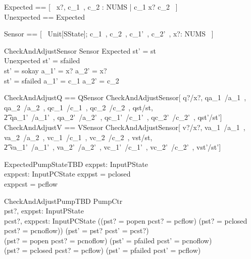 \documentclass{report} %
\begin{document}
\begin{zed}
  Expected == [~ x?, c\_1~, c\_2 : NUMS | c\_1 \leq x? \leq c\_2 ~] \\ %
  Unexpected == \lnot Expected 
\end{zed}

\begin{zed}
  Sensor == [~ \Delta Unit[SState]; c\_1~, c\_2~, c\_1'~, c\_2'~, x?: NUMS ~]
\end{zed}

\begin{schema}{CheckAndAdjustSensor}
  Sensor
  \where %
  Expected \implies st' = st \\ %
  Unexpected \implies st' = sfailed \\ %
  st' = sokay \implies a\_1' = x? \land a\_2' = x?  \\ %
  st' = sfailed \implies a\_1' = c\_1 \land a\_2' = c\_2
\end{schema}

\begin{zed}
  CheckAndAdjustQ == QSensor \land {} %
    CheckAndAdjustSensor[
      q?/x?, qa\_1~/a\_1~, qa\_2~/a\_2~, qc\_1~/c\_1~, qc\_2~/c\_2~, qst/st, %
      \\ \t2 %
      qa\_1'~/a\_1'~, qa\_2'~/a\_2'~, qc\_1'~/c\_1'~, qc\_2'~/c\_2'~, qst'/st']
  \also %
  CheckAndAdjustV == VSensor \land {} %
    CheckAndAdjustSensor[
      v?/x?, va\_1~/a\_1~, va\_2~/a\_2~, vc\_1~/c\_1~, vc\_2~/c\_2~, vst/st,
      \\ \t2 %
      va\_1'~/a\_1'~, va\_2'~/a\_2'~, vc\_1'~/c\_1'~, vc\_2'~/c\_2'~, vst'/st']
\end{zed}

\begin{schema}{ExpectedPumpStateTBD}
  exppst: InputPState \\ %
  exppcst: InputPCState
  \where
  exppst = pclosed \\
  exppcst = pcflow
\end{schema}

\begin{schema}{CheckAndAdjustPumpTBD}
  \Delta PumpCtr \\ %
  pst?, exppst: InputPState \\ %
  pcst?, exppcst: InputPCState
  \where %
  ((pst? = popen \land pcst? = pcflow) \lor (pst? = pclosed \land pcst? = pcnoflow))
    \implies (pst' = pst? \land pcst' = pcst?) \\
  (pst? = popen \land pcst? = pcnoflow) \implies (pst' = pfailed \land pcst' = pcnoflow) \\
  (pst? = pclosed \land pcst? = pcflow) \implies (pst' = pfailed \land pcst' = pcflow)
\end{schema}
\end{document}
